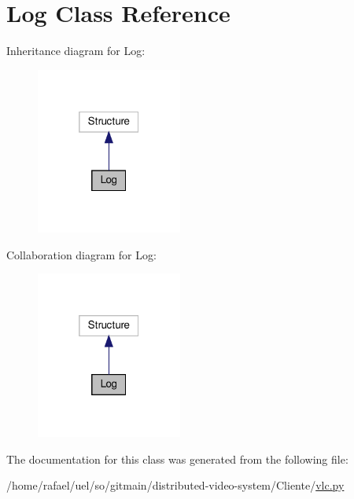 \hypertarget{classvlc_1_1_log}{}\section{Log Class Reference}
\label{classvlc_1_1_log}


Inheritance diagram for Log\+:
\nopagebreak
\begin{figure}[H]
\begin{center}
\leavevmode
\includegraphics[width=136pt]{classvlc_1_1_log__inherit__graph}
\end{center}
\end{figure}


Collaboration diagram for Log\+:
\nopagebreak
\begin{figure}[H]
\begin{center}
\leavevmode
\includegraphics[width=136pt]{classvlc_1_1_log__coll__graph}
\end{center}
\end{figure}


The documentation for this class was generated from the following file\+:\begin{DoxyCompactItemize}
\item 
/home/rafael/uel/so/gitmain/distributed-\/video-\/system/\+Cliente/\hyperlink{vlc_8py}{vlc.\+py}\end{DoxyCompactItemize}
